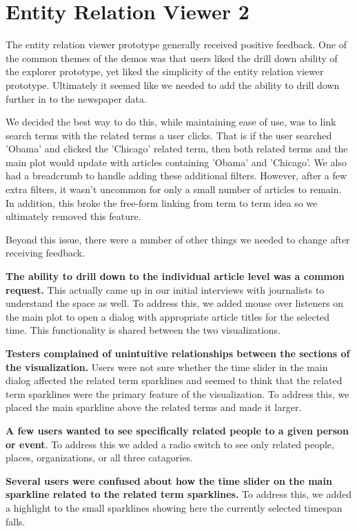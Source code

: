 \section{Entity Relation Viewer 2}

The entity relation viewer prototype generally received positive feedback. One of the common themes of the demos was that users liked the drill down ability of the explorer prototype, yet liked the simplicity of the entity relation viewer prototype. Ultimately it seemed like we needed to add the ability to drill down further in to the newspaper data.

We decided the best way to do this, while maintaining ease of use, was to link search terms with the related terms a user clicks. That is if the user searched 'Obama' and clicked the 'Chicago' related term, then both related terms and the main plot would update with articles containing 'Obama' and 'Chicago'. We also had a breadcrumb to handle adding these additional filters. However, after a few extra filters, it wasn't uncommon for only a small number of articles to remain. In addition, this broke the free-form linking from term to term idea so we ultimately removed this feature.

Beyond this issue, there were a number of other things we needed to change after receiving feedback.

\textbf{The ability to drill down to the individual article level was a common request.} This actually came up in our initial interviews with journalists to understand the space as well. To address this, we added mouse over listeners on the main plot to open a dialog with appropriate article titles for the selected time. This functionality is shared between the two visualizations.

\textbf{Testers complained of unintuitive relationships between the sections of the visualization.} Users were not sure whether the time slider in the main dialog affected the related term sparklines and seemed to think that the related term sparklines were the primary feature of the visualization. To address this, we placed the main sparkline above the related terms and made it larger.

\textbf{A few users wanted to see specifically related people to a given person or event}. To address this we added a radio switch to see only related people, places, organizations, or all three catagories.

\textbf{Several users were confused about how the time slider on the main sparkline related to the related term sparklines.} To address this, we added a highlight to the small sparklines showing here the currently selected timespan falls. 

